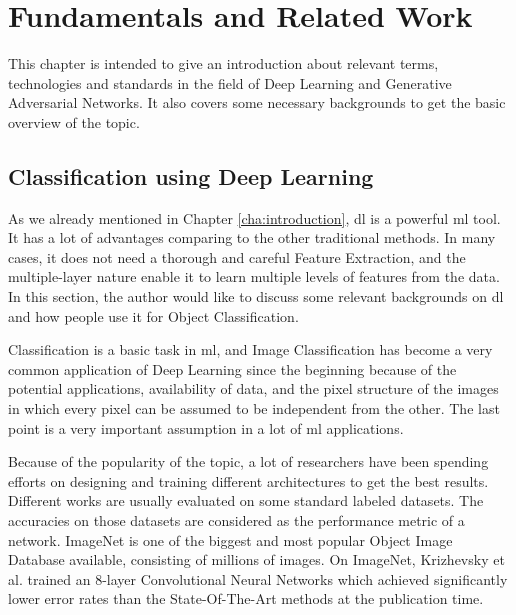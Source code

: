 \chapter{Fundamentals and Related Work\label{cha:relatedwork}}

This chapter is intended to give an introduction about relevant terms, technologies and
standards in the field of Deep Learning and Generative Adversarial Networks. It also
covers some necessary backgrounds to get the basic overview of the topic.

\section{Classification using Deep Learning}
As we already mentioned in Chapter \ref{cha:introduction}, \acrfull{dl} is a powerful
\acrshort{ml} tool. It has a lot of advantages comparing to the other traditional methods.
In many cases, it does not need a thorough and careful Feature Extraction, and the
multiple-layer nature enable it to learn multiple levels of features from the data. In
this section, the author would like to discuss some relevant backgrounds on \acrshort{dl}
and how people use it for Object Classification.

Classification is a basic task in \acrshort{ml}, and Image Classification has become a
very common application of Deep Learning since the beginning because of the potential
applications, availability of data, and the pixel structure of the images in which every
pixel can be assumed to be independent from the other. The last point is a very important
assumption in a lot of \acrshort{ml} applications. 

Because of the popularity of the topic, a lot of researchers have been spending efforts on
designing and training different architectures to get the best results.  Different works
are usually evaluated on some standard labeled datasets. The accuracies on those datasets
are considered as the performance metric of a network. ImageNet \cite{imagenet} is
one of the biggest and most popular Object Image Database available, consisting of
millions of images. On ImageNet, Krizhevsky et al. \cite{alexnet} trained an 8-layer
Convolutional Neural Networks which achieved significantly lower error rates than the
State-Of-The-Art methods at the publication time.

